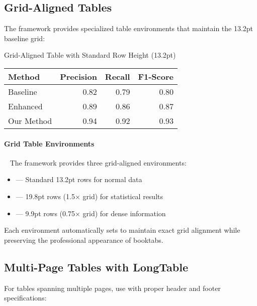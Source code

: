 \documentclass[11pt]{article}
\begin{document}
\subsection{Grid-Aligned Tables}

The framework provides specialized table environments that maintain the 13.2pt baseline grid:

\begin{gridtable}[tbp]
  \caption{Grid-Aligned Table with Standard Row Height (13.2pt)}
  \label{tab:grid-example}
  \centering
  \begin{tabular}{@{}lrrr@{}}
    \toprule
    Method & Precision & Recall & F1-Score \\
    \midrule
    Baseline & 0.82 & 0.79 & 0.80 \\
    Enhanced & 0.89 & 0.86 & 0.87 \\
    Our Method & 0.94 & 0.92 & 0.93 \\
    \bottomrule
  \end{tabular}
\end{gridtable}

\paragraph{Grid Table Environments}~ The framework provides three grid-aligned environments:
\begin{itemize}
\item {} --- Standard 13.2pt rows for normal data
\item {} --- 19.8pt rows (1.5× grid) for statistical results
\item {} --- 9.9pt rows (0.75× grid) for dense information
\end{itemize}

Each environment automatically sets  to maintain exact grid alignment while preserving the professional appearance of booktabs.

\subsection{Multi-Page Tables with LongTable}

For tables spanning multiple pages, use  with proper header and footer specifications:
\end{document}
